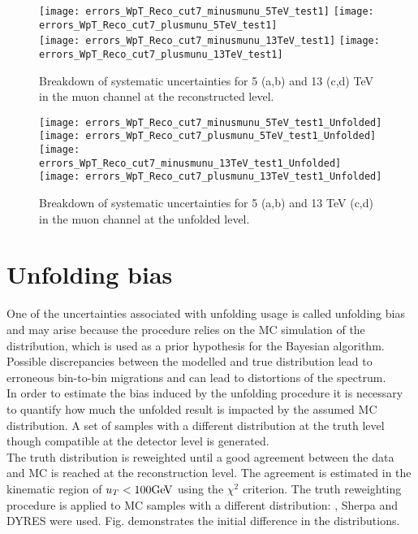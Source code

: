\begin{figure}[h]
	\centering
	{\texttt{[image: errors\_WpT\_Reco\_cut7\_minusmunu\_5TeV\_test1]}}
	{\texttt{[image: errors\_WpT\_Reco\_cut7\_plusmunu\_5TeV\_test1]}} \\
	{\texttt{[image: errors\_WpT\_Reco\_cut7\_minusmunu\_13TeV\_test1]}}
	{\texttt{[image: errors\_WpT\_Reco\_cut7\_plusmunu\_13TeV\_test1]}}
	\caption{ Breakdown of systematic uncertainties for 5 (a,b) and 13 (c,d) TeV in the muon channel at the reconstructed level.}
	\label{fig:reco_sys_bkd_muons}
\end{figure}

\begin{figure}[h]
	\centering
	{\texttt{[image: errors\_WpT\_Reco\_cut7\_minusmunu\_5TeV\_test1\_Unfolded]}}
	{\texttt{[image: errors\_WpT\_Reco\_cut7\_plusmunu\_5TeV\_test1\_Unfolded]}} \\
	{\texttt{[image: errors\_WpT\_Reco\_cut7\_minusmunu\_13TeV\_test1\_Unfolded]}}
	{\texttt{[image: errors\_WpT\_Reco\_cut7\_plusmunu\_13TeV\_test1\_Unfolded]}}
	\caption{ Breakdown of systematic uncertainties for 5 (a,b) and 13 TeV (c,d) in the muon channel at the unfolded level.}
	\label{fig:unf_sys_bkd_muons}
\end{figure}
\clearpage
\section{Unfolding bias}
One of the uncertainties associated with unfolding usage is called unfolding bias and may arise because the procedure relies on the MC simulation of the distribution, which is used as a prior hypothesis for the Bayesian algorithm. Possible discrepancies between the modelled and true distribution lead to erroneous  bin-to-bin migrations and can lead to distortions of the spectrum.\\
In order to estimate the bias induced by the unfolding procedure it is necessary to quantify how much the unfolded result is impacted by the assumed MC distribution. A set of samples with a different distribution at the truth level though compatible at the detector level is generated. \\

The truth distribution is reweighted until a good agreement between the data and MC is reached at the reconstruction level. The agreement is estimated in the kinematic region of $u_T<100\text{Ge\kern -0.1em V}$ using the $\chi^2$ criterion. The truth reweighting procedure is applied to MC samples with a different distribution: \Pythia, Sherpa and DYRES were used. Fig. demonstrates the initial difference in the distributions.\\

